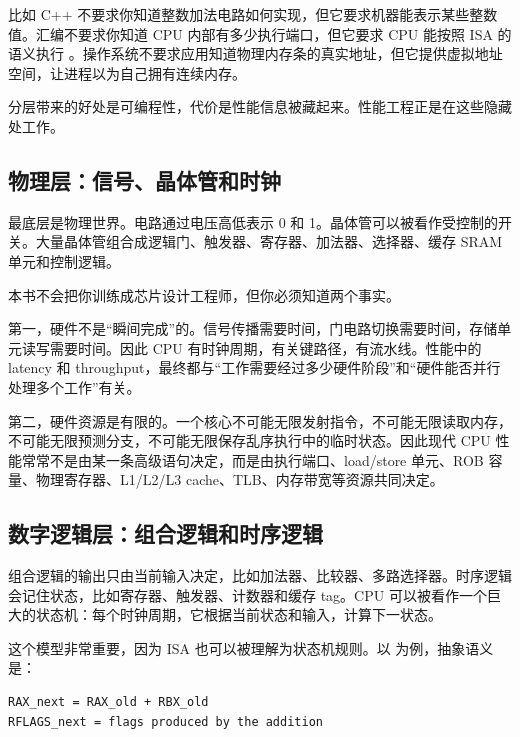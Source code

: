 比如 C++ 不要求你知道整数加法电路如何实现，但它要求机器能表示某些整数值。汇编不要求你知道 CPU 内部有多少执行端口，但它要求 CPU 能按照 ISA 的语义执行 。操作系统不要求应用知道物理内存条的真实地址，但它提供虚拟地址空间，让进程以为自己拥有连续内存。

分层带来的好处是可编程性，代价是性能信息被藏起来。性能工程正是在这些隐藏处工作。

\subsection{物理层：信号、晶体管和时钟}

最底层是物理世界。电路通过电压高低表示 0 和 1。晶体管可以被看作受控制的开关。大量晶体管组合成逻辑门、触发器、寄存器、加法器、选择器、缓存 SRAM 单元和控制逻辑。

本书不会把你训练成芯片设计工程师，但你必须知道两个事实。

第一，硬件不是“瞬间完成”的。信号传播需要时间，门电路切换需要时间，存储单元读写需要时间。因此 CPU 有时钟周期，有关键路径，有流水线。性能中的 latency 和 throughput，最终都与“工作需要经过多少硬件阶段”和“硬件能否并行处理多个工作”有关。

第二，硬件资源是有限的。一个核心不可能无限发射指令，不可能无限读取内存，不可能无限预测分支，不可能无限保存乱序执行中的临时状态。因此现代 CPU 性能常常不是由某一条高级语句决定，而是由执行端口、load/store 单元、ROB 容量、物理寄存器、L1/L2/L3 cache、TLB、内存带宽等资源共同决定。

\subsection{数字逻辑层：组合逻辑和时序逻辑}

组合逻辑的输出只由当前输入决定，比如加法器、比较器、多路选择器。时序逻辑会记住状态，比如寄存器、触发器、计数器和缓存 tag。CPU 可以被看作一个巨大的状态机：每个时钟周期，它根据当前状态和输入，计算下一状态。

这个模型非常重要，因为 ISA 也可以被理解为状态机规则。以  为例，抽象语义是：

\begin{center}
\begin{minipage}{0.72\linewidth}
\begin{verbatim}
RAX_next = RAX_old + RBX_old
RFLAGS_next = flags produced by the addition
\end{verbatim}
\end{minipage}
\end{center}


